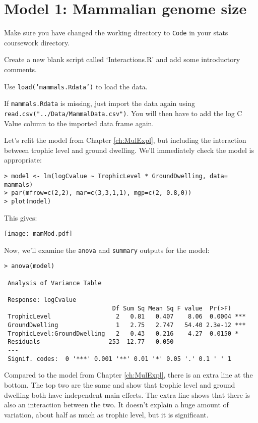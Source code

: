 \section{Model 1: Mammalian genome size}

\begin{compactitem}[$\quad\star$]
	\item Make sure you have changed the working directory to {\tt Code} 
	in your stats coursework directory.
	\item Create a new blank script called `Interactions.R' and add some 
	introductory comments.
	\item Use {\tt load('mammals.Rdata')} to load the data.
\end{compactitem}

If {\tt mammals.Rdata} is missing, just import the data again using 
{\tt read.csv("../Data/MammalData.csv")}. You will then have to add the 
log C Value column to the imported data frame again. 

Let's refit the model from Chapter \ref{ch:MulExpl}, but including the 
interaction between trophic level and ground dwelling. We'll 
immediately check the model is appropriate:

\begin{lstlisting}
> model <- lm(logCvalue ~ TrophicLevel * GroundDwelling, data= mammals)
> par(mfrow=c(2,2), mar=c(3,3,1,1), mgp=c(2, 0.8,0))
> plot(model)	
\end{lstlisting}

This gives:
\begin{center}
	\texttt{[image: mamMod.pdf]}
\end{center} 

Now, we'll examine the {\tt anova} and {\tt summary} outputs for the 
model:

\begin{lstlisting}
> anova(model)

 Analysis of Variance Table
 
 Response: logCvalue
                              Df Sum Sq Mean Sq F value  Pr(>F)    
 TrophicLevel                  2   0.81   0.407    8.06  0.0004 ***
 GroundDwelling                1   2.75   2.747   54.40 2.3e-12 ***
 TrophicLevel:GroundDwelling   2   0.43   0.216    4.27  0.0150 *  
 Residuals                   253  12.77   0.050                    
 ---
 Signif. codes:  0 '***' 0.001 '**' 0.01 '*' 0.05 '.' 0.1 ' ' 1 
\end{lstlisting}

Compared to the model from Chapter \ref{ch:MulExpl}, there is an extra line at the 
bottom. The top two are the same and show that trophic level and ground 
dwelling both have independent main effects. The extra line shows that 
there is also an interaction between the two. It doesn't explain a huge 
amount of variation, about half as much as trophic level, but it is 
significant.

